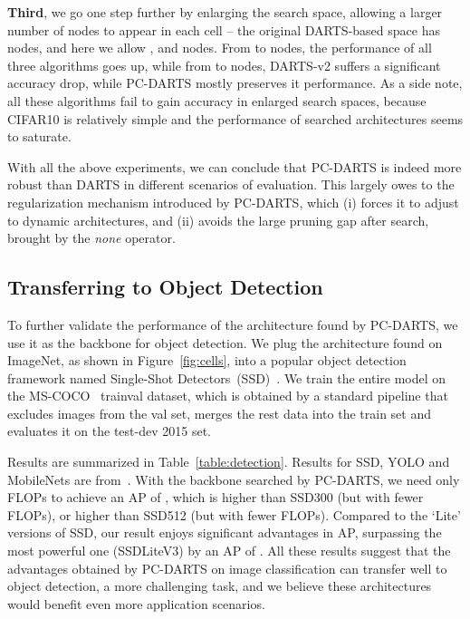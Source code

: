 \documentclass{article} \usepackage{iclr2020_conference,times}
\begin{document}
\textbf{Third}, we go one step further by enlarging the search space, allowing a larger number of nodes to appear in each cell -- the original DARTS-based space has  nodes, and here we allow ,  and  nodes. From  to  nodes, the performance of all three algorithms goes up, while from  to  nodes, DARTS-v2 suffers a significant accuracy drop, while PC-DARTS mostly preserves it performance. As a side note, all these algorithms fail to gain accuracy in enlarged search spaces, because CIFAR10 is relatively simple and the performance of searched architectures seems to saturate.

With all the above experiments, we can conclude that PC-DARTS is indeed more robust than DARTS in different scenarios of evaluation. This largely owes to the regularization mechanism introduced by PC-DARTS, which (i) forces it to adjust to dynamic architectures, and (ii) avoids the large pruning gap after search, brought by the \textit{none} operator.



\subsection{Transferring to Object Detection}

To further validate the performance of the architecture found by PC-DARTS, we use it as the backbone for object detection. We plug the architecture found on ImageNet, as shown in Figure~\ref{fig:cells}, into a popular object detection framework named Single-Shot Detectors~(SSD)~\citep{Liu2016SSDSS}. We train the entire model on the MS-COCO~\citep{Lin2014MicrosoftCC} trainval dataset, which is obtained by a standard pipeline that excludes  images from the val set, merges the rest data into the  train set and evaluates it on the test-dev 2015 set.

Results are summarized in Table~\ref{table:detection}. Results for SSD, YOLO and MobileNets are from~\citep{tan2018mnasnet}. With the backbone searched by PC-DARTS, we need only  FLOPs to achieve an AP of , which is  higher than SSD300 (but with  fewer FLOPs), or  higher than SSD512 (but with  fewer FLOPs). Compared to the `Lite' versions of SSD, our result enjoys significant advantages in AP, surpassing the most powerful one (SSDLiteV3) by an AP of . All these results suggest that the advantages obtained by PC-DARTS on image classification can transfer well to object detection, a more challenging task, and we believe these architectures would benefit even more application scenarios.
\end{document}
